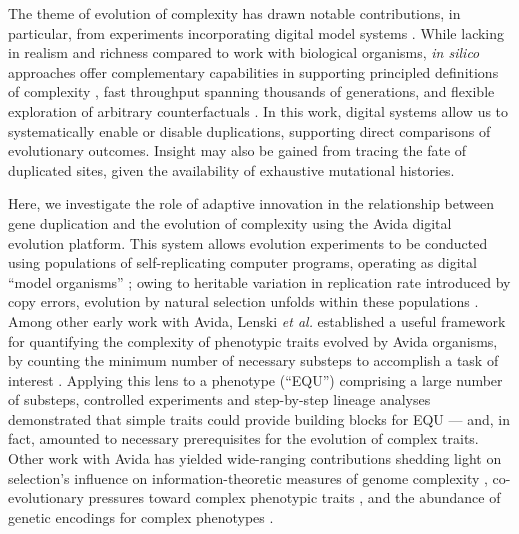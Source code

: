 The theme of evolution of complexity has drawn notable contributions, in particular, from experiments incorporating digital model systems \citep{Fortuna2022}.
While lacking in realism and richness compared to work with biological organisms, \textit{in silico} approaches offer complementary capabilities in supporting principled definitions of complexity \citep{Adami2002}, fast throughput spanning thousands of generations, and flexible exploration of arbitrary counterfactuals \citep{langton1989artificial}.
In this work, digital systems allow us to systematically enable or disable duplications, supporting direct comparisons of evolutionary outcomes.
Insight may also be gained from tracing the fate of duplicated sites, given the availability of exhaustive mutational histories.



Here, we investigate the role of adaptive innovation in the relationship between gene duplication and the evolution of complexity using the Avida digital evolution platform.
This system allows evolution experiments to be conducted using populations of self-replicating computer programs, operating as digital ``model organisms'' \citep{Ofria:2009avida};
owing to heritable variation in replication rate introduced by copy errors, evolution by natural selection unfolds within these populations \citep{pennock2007models}.
Among other early work with Avida, Lenski \textit{et al.} established a useful framework for quantifying the complexity of phenotypic traits evolved by Avida organisms, by counting the minimum number of necessary substeps to accomplish a task of interest \citet{Lenski2003Evolutionary}.
Applying this lens to a phenotype  (``EQU'') comprising a large number of substeps, controlled experiments and step-by-step lineage analyses demonstrated that simple traits could provide building blocks for EQU --- and, in fact, amounted to necessary prerequisites for the evolution of complex traits.
Other work with Avida has yielded wide-ranging contributions shedding light on selection's influence on information-theoretic measures of genome complexity \citep{Adami2000Evolution}, co-evolutionary pressures toward complex phenotypic traits \citep{Zaman2014Coevolution}, and the abundance of genetic encodings for complex phenotypes \citep{Fortuna2017GenotypePhenotype}.


